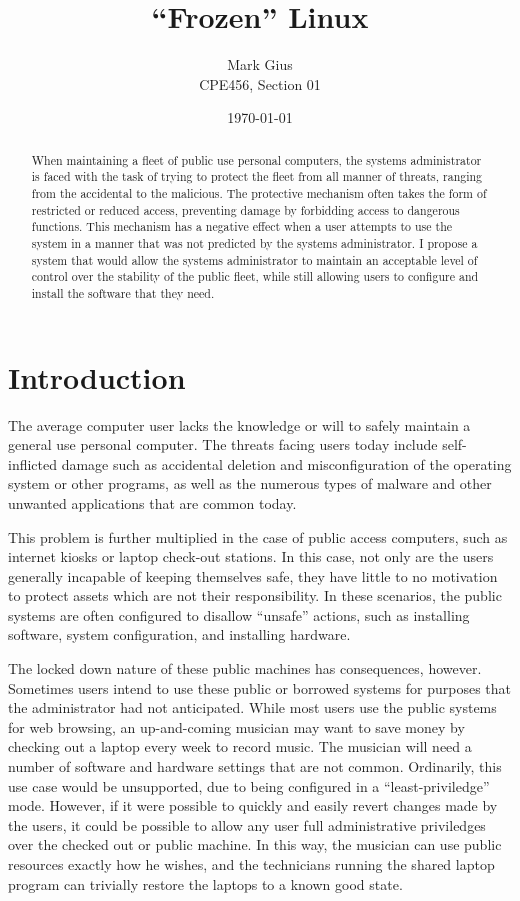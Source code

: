 \documentclass[12pt]{article}
\begin{document}
\title{``Frozen'' Linux}
\author{Mark Gius \\
        CPE456, Section 01}
\date{\today}
\maketitle

\begin{abstract}
When maintaining a fleet of public use personal computers, the systems
administrator is faced with the task of trying to protect the fleet from 
all manner of threats, ranging from the accidental to the malicious.  
The protective mechanism often takes the form of restricted or reduced 
access, preventing damage by forbidding access to dangerous functions.
This mechanism has a negative effect when a user attempts to use the system
in a manner that was not predicted by the systems administrator.
I propose a system that would allow the systems administrator to maintain
an acceptable level of control over the stability of the public fleet,
while still allowing users to configure and install the software that they
need.
\end{abstract}

\newpage
\doublespacing
\section{Introduction}
The average computer user lacks the knowledge or will to safely maintain 
a general use personal computer.  The threats facing users today include 
self-inflicted damage such as accidental deletion and misconfiguration of the 
operating system or other programs, as well as the numerous types of malware
and other unwanted applications that are common today.

This problem is further multiplied in the case of public access computers, 
such as internet kiosks or laptop check-out stations.  In this case, not 
only are the users generally incapable of keeping themselves safe, they have
little to no motivation to protect assets which are not their responsibility.
In these scenarios, the public systems are often configured to disallow 
``unsafe'' actions, such as installing software, system configuration, and
installing hardware.

The locked down nature of these public machines has consequences, however.
Sometimes users intend to use these public or borrowed systems for purposes
that the administrator had not anticipated.  While most users use the public
systems for web browsing, an up-and-coming musician may want to save money by
checking out a laptop every week to record music.  The musician will need a
number of software and hardware settings that are not common.  Ordinarily, this
use case would be unsupported, due to being configured in a
``least-priviledge'' mode.  However, if it were possible to quickly and easily
revert changes made by the users, it could be possible to allow any user full
administrative priviledges over the checked out or public machine.  In this
way, the musician can use public resources exactly how he wishes, and the
technicians running the shared laptop program can trivially restore the laptops
to a known good state.
\end{document}
